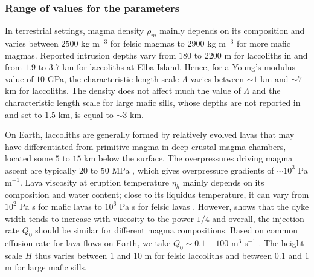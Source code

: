 \subsubsection*{Range of values for the parameters}
\label{sec:range-valu-param}

In terrestrial settings, magma density  $\rho_m$ mainly depends on its
composition and varies  between $ 2500$ kg m$^{-3}$  for felsic magmas
to  $2900$ kg  m$^{-3}$  for more  mafic  magmas.  Reported  intrusion
depths vary from $180$ to  $2200$ m for laccoliths in \citet{E:2015tl}
and from $1.9$ to $3.7$ km  for laccoliths at Elba Island.  Hence, for
a Young's modulus  value of $10$ GPa, the  characteristic length scale
$\Lambda$ varies between  $\sim 1$ km and $\sim 7$  km for laccoliths.
The  density does  not  affect much  the value  of  $\Lambda$ and  the
characteristic length  scale for large  mafic sills, whose  depths are
not reported  in \citet{Cruden:tg} and  set to  $1.5$ km, is  equal to
$\sim 3$ km.

On Earth, laccoliths are generally  formed by relatively evolved lavas
that  may have  differentiated from  primitive magma  in deep  crustal
magma chambers,  located some $5$  to $15$  km below the  surface. The
overpressures  driving magma  ascent are  typically $20$  to $50$  MPa
\citep{Stasiuk:1993kg,Barmin:2002ea},    which   gives    overpressure
gradients  of $\sim  10^3$ Pa  m$^{-1}$.  Lava  viscosity at  eruption
temperature  $\eta_h$  mainly depends  on  its  composition and  water
content; close to its liquidus temperature, it can vary from $10^2$ Pa
s   for   mafic   lavas   to   $10^{6}$  Pa   s   for   felsic   lavas
\citep{Anonymous:CZVBrBvv,Giordano:2008em,Whittington:2009fv,Chevrel:2013jn}. However,
\citet{Wada:2007tv} shows that  the dyke width tends  to increase with
viscosity  to the  power  $1/4$ \citep{Kerr:1995tl}  and overall,  the
injection   rate  $Q_0$   should  be   similar  for   different  magma
compositions.  Based on common effusion  rate for lava flows on Earth,
we       take       $Q_0\sim       0.1-100$       m$^3$       s$^{-1}$
\citep{Pieri:1986bf,Harris:2000jd,Castro:2013jo,Tuffen:2013di}.    The
height  scale $H$  thus varies  between  $ 1$  and $10$  m for  felsic
laccoliths and between $0.1$ and $1$ m for large mafic sills.

